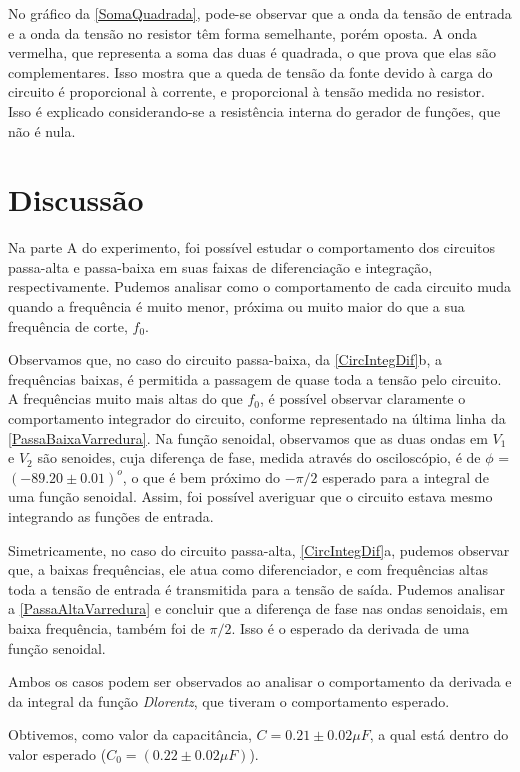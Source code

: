 \documentclass[11pt,a4paper]{article}
\begin{document}
    
    No gráfico da \cref{SomaQuadrada}, pode-se observar que a onda da tensão de entrada e a onda da tensão no resistor têm forma semelhante, porém oposta. A onda vermelha, que representa a soma das duas é quadrada, o que prova que elas são complementares. Isso mostra que a queda de tensão da fonte devido à carga do circuito é proporcional à corrente, e proporcional à tensão medida no resistor. Isso é explicado considerando-se a resistência interna do gerador de funções, que não é nula.

\section{Discussão}

    Na parte A do experimento, foi possível estudar o comportamento dos circuitos passa-alta e passa-baixa em suas faixas de diferenciação e integração, respectivamente. Pudemos analisar como o comportamento de cada circuito muda quando a frequência é muito menor, próxima ou muito maior do que a sua frequência de corte, $f_0$.
    
    Observamos que, no caso do circuito passa-baixa, da \cref{CircIntegDif}b, a frequências baixas, é permitida a passagem de quase toda a tensão pelo circuito. A frequências muito mais altas do que $f_0$, é possível observar claramente o comportamento integrador do circuito, conforme representado na última linha da \cref{PassaBaixaVarredura}. Na função senoidal, observamos que as duas ondas em $V_1$ e $V_2$ são senoides, cuja diferença de fase, medida através do osciloscópio, é de $\phi$ =$(-89.20 \pm 0.01)^o$, o que é bem próximo do $-\pi /2$ esperado para a integral de uma função senoidal. Assim, foi possível averiguar que o circuito estava mesmo integrando as funções de entrada.
    
    Simetricamente, no caso do circuito passa-alta, \cref{CircIntegDif}a, pudemos observar que, a baixas frequências, ele atua como diferenciador, e com frequências altas toda a tensão de entrada é transmitida para a tensão de saída. Pudemos analisar a \cref{PassaAltaVarredura} e concluir que a diferença de fase nas ondas senoidais, em baixa frequência, também foi de $\pi /2$. Isso é o esperado da derivada de uma função senoidal.
    
    Ambos os casos podem ser observados ao analisar o comportamento da derivada e da integral da função \textit{Dlorentz}, que tiveram o comportamento esperado.
    
    Obtivemos, como valor da capacitância,  $C = 0.21 \pm 0.02 \mu F$, a qual está dentro do valor esperado ($C_0 = (0.22 \pm 0.02 \mu F)$).
    
\end{document}
